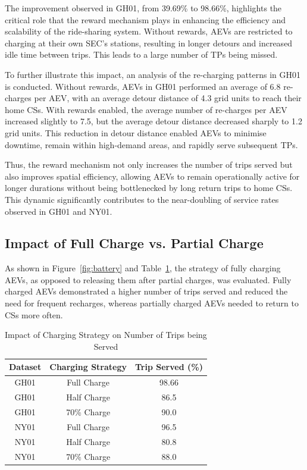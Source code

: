 The improvement observed in GH01, from 39.69\% to 98.66\%, highlights the critical role that the reward mechanism plays in enhancing the efficiency and scalability of the ride-sharing system. Without rewards, AEVs are restricted to charging at their own SEC's stations, resulting in longer detours and increased idle time between trips. This leads to a large number of TPs being missed.

To further illustrate this impact, an analysis of the re-charging patterns in GH01 is conducted. Without rewards, AEVs in GH01 performed an average of 6.8 re-charges per AEV, with an average detour distance of 4.3 grid units to reach their home CSs. With rewards enabled, the average number of re-charges per AEV increased slightly to 7.5, but the average detour distance decreased sharply to 1.2 grid units. This reduction in detour distance enabled AEVs to minimise downtime, remain within high-demand areas, and rapidly serve subsequent TPs.

Thus, the reward mechanism not only increases the number of trips served but also improves spatial efficiency, allowing AEVs to remain operationally active for longer durations without being bottlenecked by long return trips to home CSs. This dynamic significantly contributes to the near-doubling of service rates observed in GH01 and NY01.

\subsection{Impact of Full Charge vs. Partial Charge}

As shown in Figure~\ref{fig:battery} and Table~\ref{tab:charging_strategy}, the strategy of fully charging AEVs, as opposed to releasing them after partial charges, was evaluated. Fully charged AEVs demonstrated a higher number of trips served and reduced the need for frequent recharges, whereas partially charged AEVs needed to return to CSs more often.

\begin{table}[h]
\caption{Impact of Charging Strategy on Number of Trips being Served}
\begin{center}
\begin{tabular}{|c|c|c|}
\hline
\textbf{Dataset} & \textbf{Charging Strategy} & \textbf{Trip Served (\%)} \\
\hline
GH01 & Full Charge & 98.66 \\
GH01 & Half Charge & 86.5 \\
GH01 & 70\% Charge & 90.0 \\
NY01 & Full Charge & 96.5 \\
NY01 & Half Charge & 80.8 \\
NY01 & 70\% Charge & 88.0 \\
\hline
\end{tabular}
\label{tab:charging_strategy}
\end{center}
\end{table}


